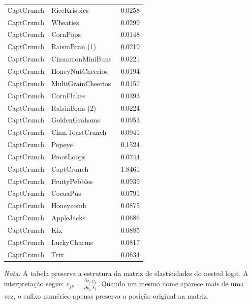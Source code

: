 \begin{table}[H]
\begin{tabular}{llr}
CaptCrunch & RiceKrispies & 0.0258 \\
CaptCrunch & Wheaties & 0.0299 \\
CaptCrunch & CornPops & 0.0148 \\
CaptCrunch & RaisinBran (1) & 0.0219 \\
CaptCrunch & CinnamonMiniBuns & 0.0221 \\
CaptCrunch & HoneyNutCheerios & 0.0194 \\
CaptCrunch & MultiGrainCheerios & 0.0157 \\
CaptCrunch & CornFlakes & 0.0393 \\
CaptCrunch & RaisinBran (2) & 0.0224 \\
CaptCrunch & GoldenGrahams & 0.0953 \\
CaptCrunch & Cinn.ToastCrunch & 0.0941 \\
CaptCrunch & Popeye & 0.1524 \\
CaptCrunch & FrootLoops & 0.0744 \\
CaptCrunch & CaptCrunch & -1.8461 \\
CaptCrunch & FruityPebbles & 0.0939 \\
CaptCrunch & CocoaPus & 0.0791 \\
CaptCrunch & Honeycomb & 0.0875 \\
CaptCrunch & AppleJacks & 0.0686 \\
CaptCrunch & Kix & 0.0885 \\
CaptCrunch & LuckyCharms & 0.0817 \\
CaptCrunch & Trix & 0.0634 \\
\bottomrule
\end{tabular}

\vspace{0.3em}
\footnotesize
\textit{Nota:} A tabela preserva a estrutura da matriz de elasticidades do nested logit. A interpretação segue: $\varepsilon_{jk}=\frac{\partial s_j}{\partial p_k}\frac{p_k}{s_j}$. Quando um mesmo nome aparece mais de uma vez, o sufixo numérico apenas preserva a posição original na matriz.
\end{table}
\endgroup


